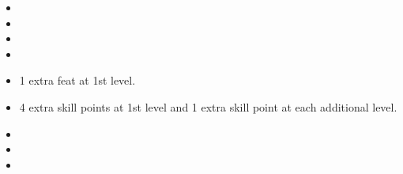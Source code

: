 
\begin{itemize}
\item {}
\item {}
\item {}
\item {}
\item 1 extra feat at 1st level.
\item 4 extra skill points at 1st level and 1 extra skill point at each additional level.
\item {}
\item {}
\item {}
\end{itemize}
